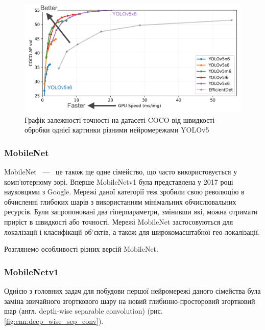 \begin{figure}[H]
    \includegraphics[width=0.5\linewidth]{images/cnn_yolo3}
    \centering
    \caption{Графік залежності точності на датасеті COCO від швидкості обробки однієї
        картинки різними нейромережами YOLOv5 \cite{website:yolov5_pytorch}
        \label{fig:yolov5:graph}
    }
\end{figure}

\subsubsection{MobileNet}

MobileNet ~---~ це також ще одне сімейство, що часто використовується у комп'ютерному зорі.
Вперше MobileNetv1 \cite{bib:mobilenet:v1} була представлена у 2017 році науковцями з Google.
Мережі даної категорії теж зробили свою революцію в обчисленні глибоких шарів з
використанням мінімальних обчислювальних ресурсів. Були запропоновані два гіперпараметри,
змінивши які, можна отримати приріст в швидкості або точності. Мережі MobileNet
застосовуються для локалізації і класифікації об'єктів, а також для широкомасштабної
гео-локалізації.

Розглянемо особливості різних версій MobileNet.

\subsubsection{MobileNetv1}
Однією з головних задач для побудови першої нейромережі даного сімейства була заміна
звичайного згорткового шару на новий глибинно-просторовий згортковий шар
(англ. depth-wise separable convolution) (рис. \ref{fig:cnn:deep_wise_sep_conv}).

